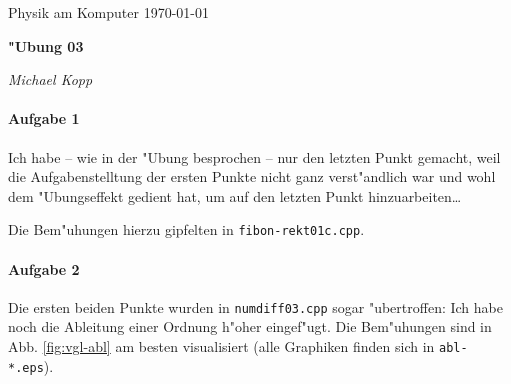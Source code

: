 \documentclass[a4paper,12pt]{article}
\begin{document}
\newcommand{\NAME}{Michael Kopp}
\newcommand{\FACH}{Physik am Komputer}
\newcommand{\TITEL}{"Ubung 03}
\newcommand{\DATUM}{\today}


\pagestyle{plain} 




\sloppy

\begin{center}
\FACH
\hfill
\DATUM
\end{center}

\vspace{-5mm} %

\begin{center}
  \begin{Large}
 \textbf{\TITEL}
  \end{Large}
\end{center}

\vspace{-3mm}

\begin{center}
\hrulefill
\quad 
\textit{\NAME}
\,
\hrulefill
\end{center}
 
 


\paragraph{Aufgabe 1}

Ich habe -- wie in der "Ubung besprochen -- nur den letzten Punkt gemacht, weil
die Aufgabenstelltung der ersten Punkte nicht ganz verst"andlich war und wohl
dem "Ubungseffekt gedient hat, um auf den letzten Punkt hinzuarbeiten\dots

Die Bem"uhungen hierzu gipfelten in \texttt{fibon-rekt01c.cpp}.




\paragraph{Aufgabe 2}

Die ersten beiden Punkte wurden in \texttt{numdiff03.cpp} sogar "ubertroffen:
Ich habe noch die Ableitung einer Ordnung h"oher eingef"ugt. Die Bem"uhungen
sind in Abb. \ref{fig:vgl-abl} am besten visualisiert (alle Graphiken finden sich in
\texttt{abl-*.eps}).
\end{document}

